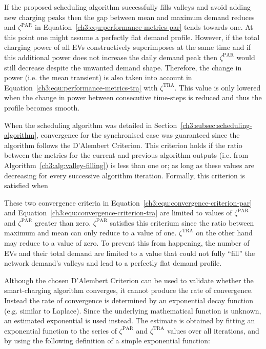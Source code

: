 If the proposed scheduling algorithm successfully fills valleys and avoid adding new charging peaks then the gap between mean and maximum demand reduces and $\zeta^\text{PAR}$ in Equation~\ref{ch3:equ:performance-metrics-par} tends towards one.
At this point one might assume a perfectly flat demand profile.
However, if the total charging power of all EVs constructively superimposes at the same time and if this additional power does not increase the daily demand peak then $\zeta^\text{PAR}$ would still decrease despite the unwanted demand shape.
Therefore, the change in power (i.e. the mean transient) is also taken into account in Equation~\ref{ch3:equ:performance-metrics-tra} with $\zeta^\text{TRA}$.
This value is only lowered when the change in power between consecutive time-steps is reduced and thus the profile becomes smooth.

When the scheduling algorithm was detailed in Section~\ref{ch3:subsec:scheduling-algorithm}, convergence for the synchronised case was guaranteed since the algorithm follows the D'Alembert Criterion.
This criterion holds if the ratio between the metrics for the current and previous algorithm outputs (i.e. from Algorithm~\ref{ch3:alg:valley-filling}) is less than one or; as long as these values are decreasing for every successive algorithm iteration.
Formally, this criterion is satisfied when



These two convergence criteria in Equation~\ref{ch3:equ:convergence-criterion-par} and Equation~\ref{ch3:equ:convergence-criterion-tra} are limited to values of $\zeta^\text{PAR}$ and $\zeta^\text{PAR}$ greater than zero.
$\zeta^\text{PAR}$ satisfies this criterium since the ratio between maximum and mean can only reduce to a value of one.
$\zeta^\text{TRA}$ on the other hand may reduce to a value of zero.
To prevent this from happening, the number of EVs and their total demand are limited to a value that could not fully ``fill'' the network demand's valleys and lead to a perfectly flat demand profile.

Although the chosen D'Alembert Criterion can be used to validate whether the smart-charging algorithm converges, it cannot produce the rate of convergence.
Instead the rate of convergence is determined by an exponential decay function (e.g. similar to Laplace).
Since the underlying mathematical function is unknown, an estimated exponential is used instead.
The estimate is obtained by fitting an exponential function to the series of $\zeta^\text{PAR}$ and $\zeta^\text{TRA}$ values over all iterations, and by using the following definition of a simple exponential function:

